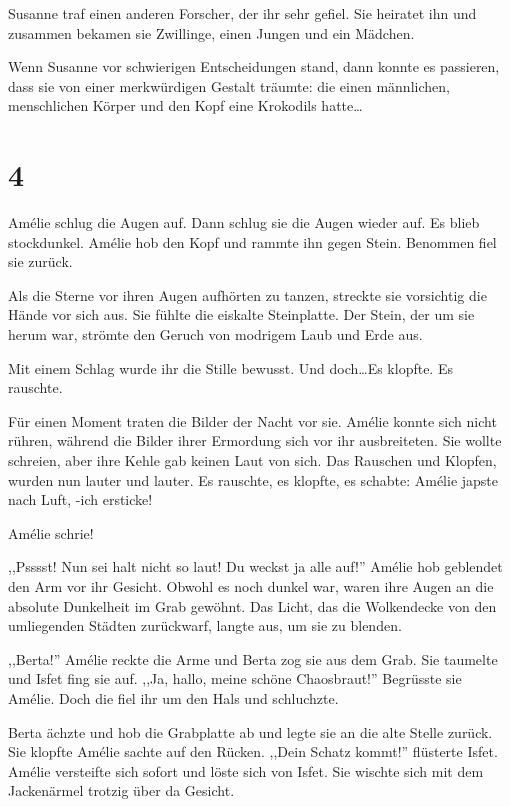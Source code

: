 \documentclass[11pt,titlepage,a5paper]{book}
\begin{document}
Susanne traf einen anderen Forscher, der ihr sehr gefiel. Sie heiratet ihn und zusammen bekamen sie Zwillinge, einen Jungen und ein Mädchen.

Wenn Susanne vor schwierigen Entscheidungen stand, dann konnte es passieren, dass sie von einer merkwürdigen Gestalt träumte: die einen männlichen, menschlichen Körper und den Kopf eine Krokodils hatte\dots

\section*{4}

Amélie schlug die Augen auf. Dann schlug sie die Augen wieder auf. Es blieb stockdunkel. Amélie hob den Kopf und rammte ihn gegen Stein. Benommen fiel sie zurück. 

Als die Sterne vor ihren Augen aufhörten zu tanzen, streckte sie vorsichtig die Hände vor sich aus. Sie fühlte die eiskalte Steinplatte. Der Stein, der um sie herum war, strömte den Geruch von modrigem Laub und Erde aus.

Mit einem Schlag wurde ihr die Stille bewusst. Und doch\dots Es klopfte. Es rauschte. 

Für einen Moment traten die Bilder der Nacht vor sie. Amélie konnte sich nicht rühren, während die Bilder ihrer Ermordung sich vor ihr ausbreiteten. Sie wollte schreien, aber ihre Kehle gab keinen Laut von sich. Das Rauschen und Klopfen, wurden nun lauter und lauter. Es rauschte, es klopfte, es schabte: Amélie japste nach Luft, -ich ersticke!

Amélie schrie!

,,Psssst! Nun sei halt nicht so laut! Du weckst ja alle auf!'' Amélie hob geblendet den Arm vor ihr Gesicht. Obwohl es noch dunkel war, waren ihre Augen an die absolute Dunkelheit im Grab gewöhnt. Das Licht, das die Wolkendecke von den umliegenden Städten zurückwarf, langte aus, um sie zu blenden.

,,Berta!'' Amélie reckte die Arme und Berta zog sie aus dem Grab. Sie taumelte und Isfet fing sie auf. ,,Ja, hallo, meine schöne Chaosbraut!'' Begrüsste sie Amélie. Doch die fiel ihr um den Hals und schluchzte.

Berta ächzte und hob die Grabplatte ab und legte sie an die alte Stelle zurück. Sie klopfte Amélie sachte auf den Rücken. ,,Dein Schatz kommt!'' flüsterte Isfet. Amélie versteifte sich sofort und löste sich von Isfet. Sie wischte sich mit dem Jackenärmel trotzig über da Gesicht.
\end{document}
